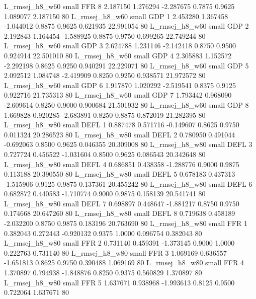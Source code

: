 L_rmsej_h8_w60      small      FFR                 8 2.187150 1.276294 -2.287675 0.7875 0.9625  1.089077    2.187150 80
L_rmsej_h8_w60      small      GDP                 1 2.453280 1.367458 -1.044012 0.8875 0.9625  0.621935   22.991054 80
L_rmsej_h8_w60      small      GDP                 2 2.192843 1.164454 -1.588925 0.8875 0.9750  0.699265   22.749244 80
L_rmsej_h8_w60      small      GDP                 3 2.624788 1.231146 -2.142418 0.8750 0.9500  0.924914   22.501010 80
L_rmsej_h8_w60      small      GDP                 4 2.305883 1.152572 -2.292198 0.8625 0.9250  0.940291   22.229071 80
L_rmsej_h8_w60      small      GDP                 5 2.092512 1.084748 -2.419909 0.8250 0.9250  0.938571   21.972572 80
L_rmsej_h8_w60      small      GDP                 6 1.917870 1.020292 -2.519541 0.8375 0.9125  0.922716   21.735313 80
L_rmsej_h8_w60      small      GDP                 7 1.793442 0.968090 -2.609614 0.8250 0.9000  0.900684   21.501932 80
L_rmsej_h8_w60      small      GDP                 8 1.669828 0.920285 -2.683891 0.8250 0.8875  0.872019   21.282395 80
L_rmsej_h8_w80      small     DEFL                 1 0.887478 0.571716 -0.149607 0.8625 0.9750  0.011324   20.286523 80
L_rmsej_h8_w80      small     DEFL                 2 0.780950 0.491044 -0.692063 0.8500 0.9625  0.046355   20.309008 80
L_rmsej_h8_w80      small     DEFL                 3 0.727724 0.456522 -1.031604 0.8500 0.9625  0.086543   20.342648 80
L_rmsej_h8_w80      small     DEFL                 4 0.686851 0.438358 -1.288776 0.9000 0.9875  0.113188   20.390550 80
L_rmsej_h8_w80      small     DEFL                 5 0.678183 0.437313 -1.515906 0.9125 0.9875  0.137361   20.455242 80
L_rmsej_h8_w80      small     DEFL                 6 0.682872 0.440583 -1.710774 0.9000 0.9875  0.158139   20.541741 80
L_rmsej_h8_w80      small     DEFL                 7 0.698897 0.448647 -1.881217 0.8750 0.9750  0.174668   20.647260 80
L_rmsej_h8_w80      small     DEFL                 8 0.719638 0.458189 -2.032200 0.8750 0.9875  0.183196   20.763690 80
L_rmsej_h8_w80      small      FFR                 1 0.382043 0.272443 -0.920132 0.9375 1.0000  0.096754    0.382043 80
L_rmsej_h8_w80      small      FFR                 2 0.731140 0.459391 -1.373145 0.9000 1.0000  0.222763    0.731140 80
L_rmsej_h8_w80      small      FFR                 3 1.069169 0.636557 -1.651813 0.8625 0.9750  0.390488    1.069169 80
L_rmsej_h8_w80      small      FFR                 4 1.370897 0.794938 -1.848876 0.8250 0.9375  0.560829    1.370897 80
L_rmsej_h8_w80      small      FFR                 5 1.637671 0.938968 -1.993613 0.8125 0.9500  0.722064    1.637671 80
